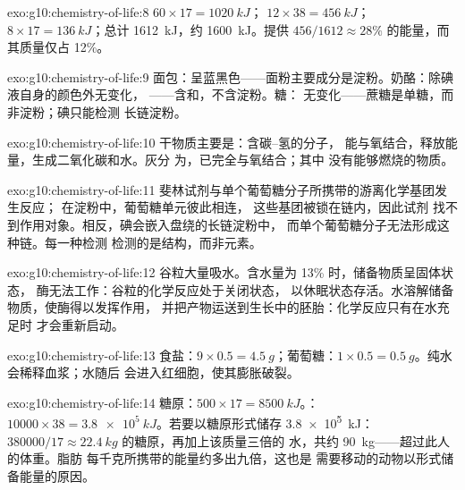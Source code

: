 \begin{solution}{exo:g10:chemistry-of-life:8}
 $60 \times 17 = \qty{1020}{kJ}$； $12 \times 38 =
\qty{456}{kJ}$； $8 \times 17 = \qty{136}{kJ}$；总计
\qty{1612}{kJ}，约 \qty{1600}{kJ}。提供 $456/1612 \approx
28\%$ 的能量，而其质量仅占 12\%。
\end{solution}

\begin{solution}{exo:g10:chemistry-of-life:9}
面包：呈蓝黑色——面粉主要成分是淀粉。奶酪：除碘液自身的颜色外无变化，
——含和，不含淀粉。糖：
无变化——蔗糖是单糖，而非淀粉；碘只能检测
长链淀粉。
\end{solution}

\begin{solution}{exo:g10:chemistry-of-life:10}
干物质主要是：含碳–氢的分子，
能与氧结合，释放能量，生成二氧化碳和水。灰分
为，已完全与氧结合；其中
没有能够燃烧的物质。
\end{solution}

\begin{solution}{exo:g10:chemistry-of-life:11}
斐林试剂与单个葡萄糖分子所携带的游离化学基团发生反应；
在淀粉中，葡萄糖单元彼此相连，
这些基团被锁在链内，因此试剂
找不到作用对象。相反，碘会嵌入盘绕的长链淀粉中，
而单个葡萄糖分子无法形成这种链。每一种检测
检测的是结构，而非元素。
\end{solution}

\begin{solution}{exo:g10:chemistry-of-life:12}
谷粒大量吸水。含水量为 13\% 时，储备物质呈固体状态，
酶无法工作：谷粒的化学反应处于关闭状态，
以休眠状态存活。水溶解储备物质，使酶得以发挥作用，
并把产物运送到生长中的胚胎：化学反应只有在水充足时
才会重新启动。
\end{solution}

\begin{solution}{exo:g10:chemistry-of-life:13}
食盐：$9 \times 0.5 = \qty{4.5}{g}$；葡萄糖：$1 \times 0.5 =
\qty{0.5}{g}$。纯水会稀释血浆；水随后
会进入红细胞，使其膨胀破裂。
\end{solution}

\begin{solution}{exo:g10:chemistry-of-life:14}
糖原：$500 \times 17 = \qty{8500}{kJ}$。：$10000 \times 38 =
\qty{3.8e5}{kJ}$。若要以糖原形式储存 \qty{3.8e5}{kJ}：$380000/17
\approx \qty{22.4}{kg}$ 的糖原，再加上该质量三倍的
水，共约 \qty{90}{kg}——超过此人的体重。脂肪
每千克所携带的能量约多出九倍，这也是
需要移动的动物以形式储备能量的原因。
\end{solution}


